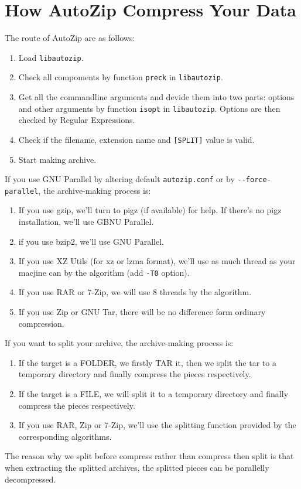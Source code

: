 \documentclass[journal,twocolumn]{IEEEtran}
\begin{document}
\section{How AutoZip Compress Your Data}
The route of AutoZip are as follows:
\begin{enumerate}
\item Load \verb|libautozip|.
\item Check all compoments by function \verb|preck| in \verb|libautozip|.
\item Get all the commandline arguments and devide them into two parts: options and other arguments by function \verb|isopt| in \verb|libautozip|. Options are then checked by Regular Expressions.
\item Check if the filename, extension name and \verb|[SPLIT]| value is valid.
\item Start making archive.
\end{enumerate}
If you use GNU Parallel by altering default \verb|autozip.conf| or by \verb|--force-parallel|, the archive-making process is:
\begin{enumerate}
\item If you use gzip, we'll turn to pigz (if available) for help. If there's no pigz installation, we'll use GBNU Parallel.
\item if you use bzip2, we'll use GNU Parallel.
\item If you use XZ Utils (for xz or lzma format), we'll use as much thread as your macjine can by the algorithm (add \verb|-T0| option).
\item If you use RAR or 7-Zip, we will use 8 threads by the algorithm.
\item If you use Zip or GNU Tar, there will be no difference form ordinary compression.
\end{enumerate}
If you want to split your archive, the archive-making process is:
\begin{enumerate}
\item If the target is a FOLDER, we firstly TAR it, then we split the tar to a temporary directory and finally compress the pieces respectively.
\item If the target is a FILE, we will split it to a temporary directory and finally compress the pieces respectively.
\item If you use RAR, Zip or 7-Zip, we'll use the splitting function provided by the corresponding algorithms.
\end{enumerate}
The reason why we split before compress rather than compress then split is that when extracting the splitted archives, the splitted pieces can be parallelly decompressed.
\end{document}
